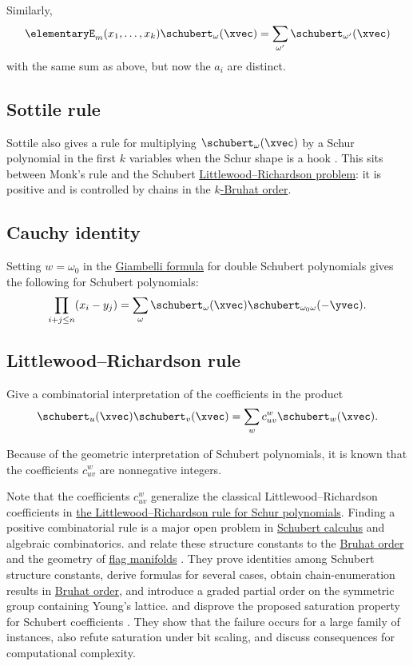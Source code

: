 Similarly,
\[
\elementaryE_{m}(x_1,\dotsc,x_k) \schubert_\omega(\xvec) = \sum_{\omega'} \schubert_{\omega'}(\xvec)
\]
with the same sum as above, but now the $a_i$ are distinct.


\subsection[schubertSottileRule]{Sottile rule}

Sottile also gives a rule for multiplying $\schubert_\omega(\xvec)$ by a Schur
polynomial in the first $k$ variables when the Schur shape is a hook
\cite{Sottile1996}.
This sits between Monk's rule and the Schubert
\hyperref[schubertLittlewoodRichardson]{Littlewood--Richardson problem}: it is
positive and is controlled by chains in the \hyperref[bruhatOrder]{$k$-Bruhat order}.


\subsection[schubertCauchyFormula]{Cauchy identity}

Setting $w=\omega_0$ in the
\hyperref[schubertDoubleGiambelliFormula]{Giambelli formula} for double
Schubert polynomials gives the following
 for Schubert polynomials:
\[
\prod_{i+j \leq n} (x_i - y_j) = \sum_{\omega} \schubert_{\omega}(\xvec) \schubert_{\omega_0 \omega}(-\yvec).
\]


\subsection[schubertLittlewoodRichardson]{Littlewood--Richardson rule}


\begin{problem}
Give a combinatorial interpretation of the coefficients in the product
\[
\schubert_u(\xvec) \schubert_v(\xvec) = \sum_{w} c^w_{uv} \schubert_w(\xvec).
\]
\end{problem}
Because of the geometric interpretation of Schubert polynomials,
it is known that the coefficients $c^w_{uv}$ are nonnegative integers.

Note that the coefficients $c^w_{uv}$ generalize the classical Littlewood--Richardson
coefficients in \hyperref[schurLittlewoodRichardson]{the Littlewood--Richardson rule for Schur polynomials}.
Finding a positive combinatorial rule is a major open problem in
\hyperref[schubertCalculus]{Schubert calculus} and algebraic combinatorics.
 and  relate these structure
constants to the \hyperref[bruhatOrder]{Bruhat order} and the geometry of
\hyperref[flagVarieties]{flag manifolds}
\cite{BergeronSottile1998}.  They prove identities among Schubert structure
constants, derive formulas for several cases, obtain chain-enumeration results
in \hyperref[bruhatOrder]{Bruhat order}, and introduce a graded partial order
on the symmetric group containing Young's lattice.
 and  disprove the proposed saturation
property for Schubert coefficients \cite{PakRobichaux2026x}.  They show that
the failure occurs for a large family of instances, also refute saturation
under bit scaling, and discuss consequences for computational complexity.

